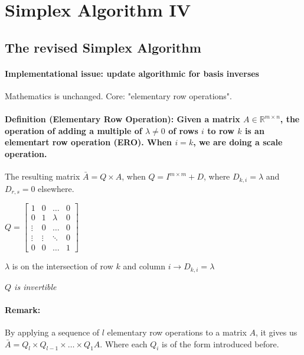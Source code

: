 \documentclass[main]{subfiles}
\begin{document}

\section{Simplex Algorithm IV}

\subsection{The revised Simplex Algorithm}

\paragraph{Implementational issue: update algorithmic for basis inverses}
Mathematics is unchanged. Core: "elementary row operations".

\paragraph{Definition (Elementary Row Operation): Given a matrix
$A \in \mathbb{R}^{m \times n}$, the operation of adding a multiple of
$\lambda \neq 0$ of rows $i$ to row $k$ is an elementart row operation (ERO).
When $i=k$, we are doing a scale operation.}
The resulting matrix $\bar{A} = Q \times A$, when $Q = I^{m\times m} + D$,
where $D_{k,i} = \lambda$ and $D_{r,s} = 0$ elsewhere.

$ Q =
\begin{bmatrix}
1 & 0 & \dots & 0 \\
0 & 1 & \lambda & 0 \\
\vdots & 0 & \dots & 0 \\
\vdots & \vdots & \ddots & 0 \\
0 & 0 & \dots & 1
\end{bmatrix}$

$\lambda$ is on the intersection of row $k$ and column
$i \rightarrow D_{k,i} = \lambda$

\emph{$Q$ is invertible}

\paragraph{Remark:}
By applying a sequence of $l$ elementary row operations to a matrix $A$, it
gives us $\bar{A} = Q_l \times Q_{l-1} \times \dots \times Q_1 A$. Where each
$Q_i$ is of the form introduced before.
\end{document}
